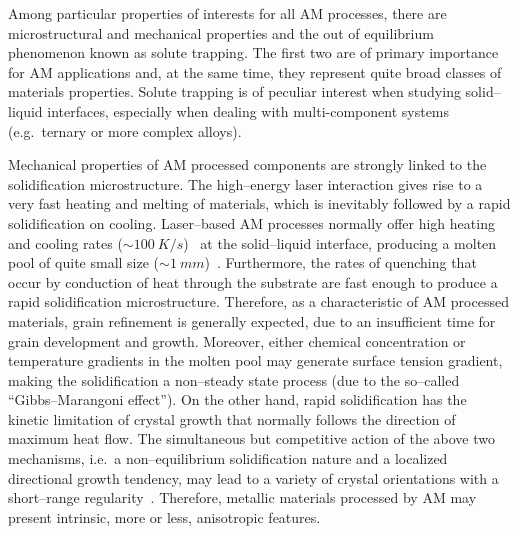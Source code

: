

Among particular properties of interests for all AM processes, there are microstructural and mechanical properties and the out of equilibrium phenomenon known as solute trapping. The first two are of primary importance for AM applications and, at the same time, they represent quite broad classes of materials properties. Solute trapping is of peculiar interest when studying solid--liquid interfaces, especially when dealing with multi-component systems (e.g.\ ternary or more complex alloys).

Mechanical properties of AM processed components are strongly linked to the solidification microstructure. The high--energy laser interaction gives rise to a very fast heating and melting of materials, which is inevitably followed by a rapid solidification on cooling. Laser--based AM processes normally offer high heating and cooling rates ($\sim\SI{100}{K/s}$)~\cite{Wright2006:GuREVIEW166} at the solid--liquid interface, producing a molten pool of quite small size ($\sim\SI{1}{mm}$)~\cite{Childs2005:GuREVIEW167}. Furthermore, the rates of quenching that occur by conduction of heat through the substrate are fast enough to produce a rapid solidification microstructure. Therefore, as a characteristic of AM processed materials, grain refinement is generally expected, due to an insufficient time for grain development and growth.
Moreover, either chemical concentration or temperature gradients in the molten pool may generate surface tension gradient, making the solidification a non--steady state process (due to the so--called ``Gibbs--Marangoni effect''). On the other hand, rapid solidification has the kinetic limitation of crystal growth that normally follows the direction of maximum heat flow. The simultaneous but competitive action of the above two mechanisms, i.e.\ a non--equilibrium solidification nature and a localized directional growth tendency, may lead to a variety of crystal orientations with a short--range regularity~\cite{Becker2009:GuREVIEW157}. Therefore, metallic materials processed by AM may present intrinsic, more or less, anisotropic features.

